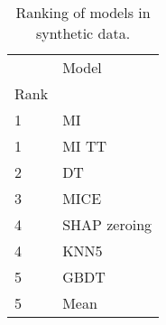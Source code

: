 \begin{table}
\centering
\caption{Ranking of models in synthetic data. }
\label{tab:synth_model_ranking}
\begin{tabular}{ll}
\toprule
{} &         Model \\
Rank &               \\
\midrule
1    &            MI \\
1    &         MI TT \\
2    &            DT \\
3    &          MICE \\
4    &  SHAP zeroing \\
4    &          KNN5 \\
5    &          GBDT \\
5    &          Mean \\
\bottomrule
\end{tabular}
\end{table}
